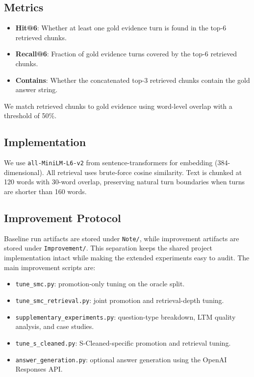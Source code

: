 \documentclass{article}
\begin{document}
\subsection{Metrics}

\begin{itemize}
    \item \textbf{Hit@6}: Whether at least one gold evidence turn is found in the top-6 retrieved chunks.
    \item \textbf{Recall@6}: Fraction of gold evidence turns covered by the top-6 retrieved chunks.
    \item \textbf{Contains}: Whether the concatenated top-3 retrieved chunks contain the gold answer string.
\end{itemize}

We match retrieved chunks to gold evidence using word-level overlap with a threshold of 50\%.

\subsection{Implementation}

We use \texttt{all-MiniLM-L6-v2} from sentence-transformers for embedding (384-dimensional). All retrieval uses brute-force cosine similarity. Text is chunked at 120 words with 30-word overlap, preserving natural turn boundaries when turns are shorter than 160 words.

\subsection{Improvement Protocol}

Baseline run artifacts are stored under \texttt{Note/}, while improvement artifacts are stored under \texttt{Improvement/}. This separation keeps the shared project implementation intact while making the extended experiments easy to audit. The main improvement scripts are:

\begin{itemize}
    \item \texttt{tune\_smc.py}: promotion-only tuning on the oracle split.
    \item \texttt{tune\_smc\_retrieval.py}: joint promotion and retrieval-depth tuning.
    \item \texttt{supplementary\_experiments.py}: question-type breakdown, LTM quality analysis, and case studies.
    \item \texttt{tune\_s\_cleaned.py}: S-Cleaned-specific promotion and retrieval tuning.
    \item \texttt{answer\_generation.py}: optional answer generation using the OpenAI Responses API.
\end{itemize}
\end{document}
